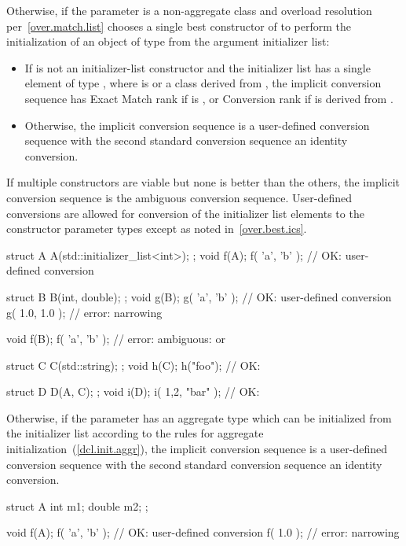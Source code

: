 \pnum
Otherwise, if the parameter is a non-aggregate class  and overload
resolution per~\ref{over.match.list} chooses a single best constructor  of
 to perform the initialization of an object of type  from the
argument initializer list:
\begin{itemize}
\item
If  is not an initializer-list constructor
and the initializer list has a single element of type \cv{} ,
where  is  or a class derived from ,
the implicit conversion sequence has Exact Match rank if  is ,
or Conversion rank if  is derived from .
\item
Otherwise, the implicit conversion sequence is a user-defined
conversion sequence with the second standard conversion sequence an
identity conversion.
\end{itemize}
If multiple constructors are viable but none is better than
the others, the implicit conversion sequence is the ambiguous conversion
sequence. User-defined conversions are allowed for conversion of the initializer
list elements to the constructor parameter types except as noted
in~\ref{over.best.ics}. \begin{example}
\begin{codeblock}
struct A {
  A(std::initializer_list<int>);
};
void f(A);
f( {'a', 'b'} );            // OK:  user-defined conversion

struct B {
  B(int, double);
};
void g(B);
g( {'a', 'b'} );            // OK:  user-defined conversion
g( {1.0, 1.0} );            // error: narrowing

void f(B);
f( {'a', 'b'} );            // error: ambiguous:  or 

struct C {
  C(std::string);
};
void h(C);
h({"foo"});                 // OK: 

struct D {
  D(A, C);
};
void i(D);
i({ {1,2}, {"bar"} });      // OK: 
\end{codeblock}
\end{example}

\pnum
Otherwise, if the parameter has an aggregate type which can be initialized from
the initializer list according to the rules for aggregate
initialization~(\ref{dcl.init.aggr}), the implicit conversion sequence is a
user-defined conversion sequence with the second standard conversion
sequence an identity conversion. \begin{example}
\begin{codeblock}
struct A {
  int m1;
  double m2;
};

void f(A);
f( {'a', 'b'} );            // OK:  user-defined conversion 
f( {1.0} );                 // error: narrowing
\end{codeblock}
\end{example}

